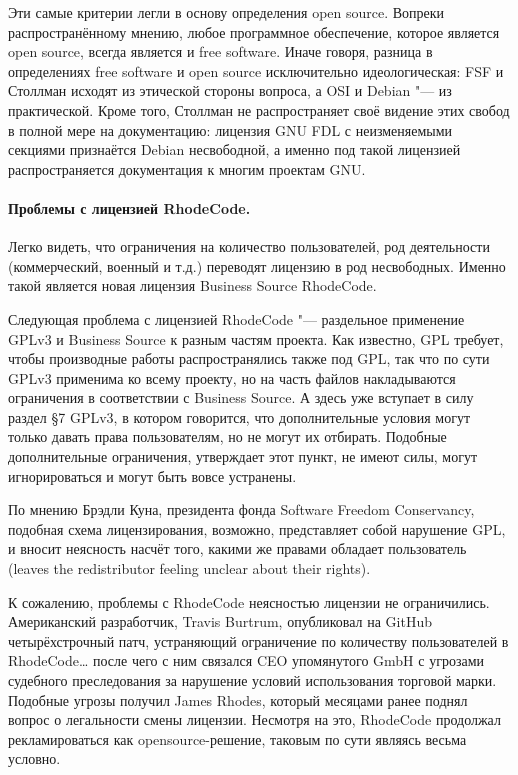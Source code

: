 \documentclass[10pt, a5paper]{article}
\begin{document}
Эти самые критерии легли в основу определения open source. Вопреки распространённому мнению, любое программное обеспечение, которое является open source, всегда является и free software. Иначе говоря, разница в определениях free software и open source исключительно идеологическая: FSF и Столлман исходят из этической стороны вопроса, а OSI и Debian "--- из практической. Кроме того, Столлман не распространяет своё видение этих свобод в полной мере на документацию: лицензия GNU FDL с неизменяемыми секциями признаётся Debian несвободной, а именно под такой лицензией распространяется документация к многим проектам GNU.

\paragraph{Проблемы с лицензией RhodeCode.}

Легко видеть, что ограничения на количество пользователей, род деятельности (коммерческий, военный и т.д.) переводят лицензию в род несвободных. Именно такой является новая лицензия Business Source RhodeCode.

Следующая проблема с лицензией RhodeCode "--- раздельное применение GPLv3 и Business Source к разным частям проекта. Как известно, GPL требует, чтобы производные работы распространялись также под GPL, так что по сути GPLv3 применима ко всему проекту, но на часть файлов накладываются ограничения в соответствии с Business Source. А здесь уже вступает в силу раздел §7 GPLv3, в котором говорится, что дополнительные условия могут только давать права пользователям, но не могут их отбирать. Подобные дополнительные ограничения, утверждает этот пункт, не имеют силы, могут игнорироваться и могут быть вовсе устранены.

По мнению Брэдли Куна, президента фонда Software Freedom Conservancy, подобная схема лицензирования, возможно, представляет собой нарушение GPL, и вносит неясность насчёт того, какими же правами обладает пользователь (leaves the redistributor feeling unclear about their rights).

К сожалению, проблемы с RhodeCode неясностью лицензии не ограничились. Американский разработчик, Travis Burtrum, опубликовал на GitHub четырёхстрочный патч, устраняющий ограничение по количеству пользователей в RhodeCode\ldots{} после чего с ним связался CEO упомянутого GmbH с угрозами судебного преследования за нарушение условий использования торговой марки. Подобные угрозы получил James Rhodes, который месяцами ранее поднял вопрос о легальности смены лицензии. Несмотря на это, RhodeCode продолжал рекламироваться как opensource-решение, таковым по сути являясь весьма условно.
\end{document}
